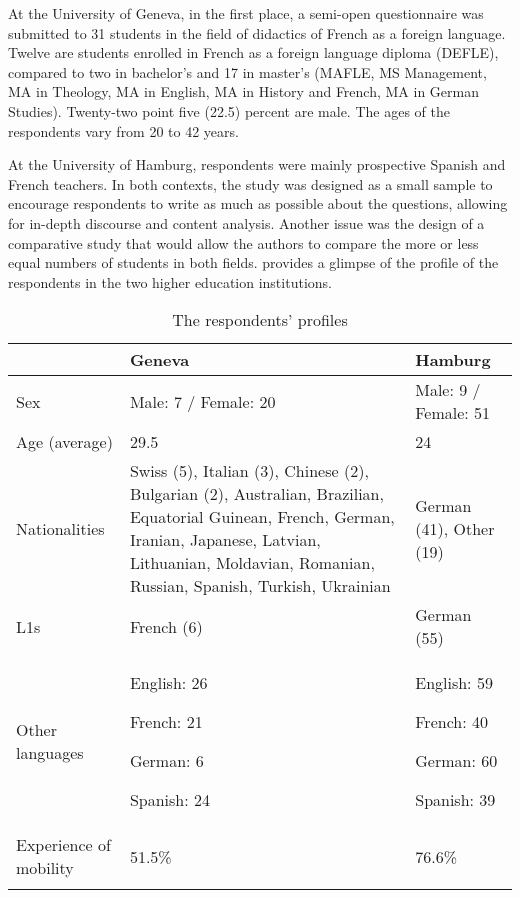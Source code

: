 \documentclass[output=paper]{../langscibook}
\begin{document}
At the University of Geneva, in the first place, a semi-open questionnaire was submitted to 31 students in the field of didactics of French as a foreign language. Twelve are students enrolled in French as a foreign language diploma (DEFLE), compared to two in bachelor's and 17 in master's (MAFLE, MS Management, MA in Theology, MA in English, MA in History and French, MA in German Studies). Twenty-two point five (22.5) percent are male. The ages of the respondents vary from 20 to 42 years. 

At the University of Hamburg, respondents were mainly prospective Spanish and French teachers. In both contexts, the study was designed as a small sample to encourage respondents to write as much as possible about the questions, allowing for in-depth discourse and content analysis. Another issue was the design of a comparative study that would allow the authors to compare the more or less equal numbers of students in both fields.  provides a glimpse of the profile of the respondents in the two higher education institutions.

\begin{table}
\begin{tabularx}{\textwidth}{lQQ}
\lsptoprule
& Geneva & Hamburg\\
\midrule
Sex & Male: 7 / Female: 20 & Male: 9 / Female: 51\\

\tablevspace
Age (average) & 29.5 & 24\\

\tablevspace
Nationalities & Swiss (5), Italian (3), Chinese (2), Bulgarian (2), Australian, Brazilian, Equatorial Guinean, French, German, Iranian, Japanese, Latvian, Lithuanian, Moldavian, Romanian, Russian, Spanish, Turkish,  Ukrainian & German (41),
Other (19)\\

\tablevspace
L1s & French (6) & German (55)\\

\tablevspace

Other languages & English: 26

French: 21

German: 6

Spanish: 24 & English: 59

French: 40

German: 60

Spanish: 39\\

\tablevspace

Experience of mobility & 51.5\% & 76.6\%\\
\lspbottomrule
\end{tabularx}
\caption{The respondents’ profiles}
\label{tab:9:2}
\end{table}
\end{document}
